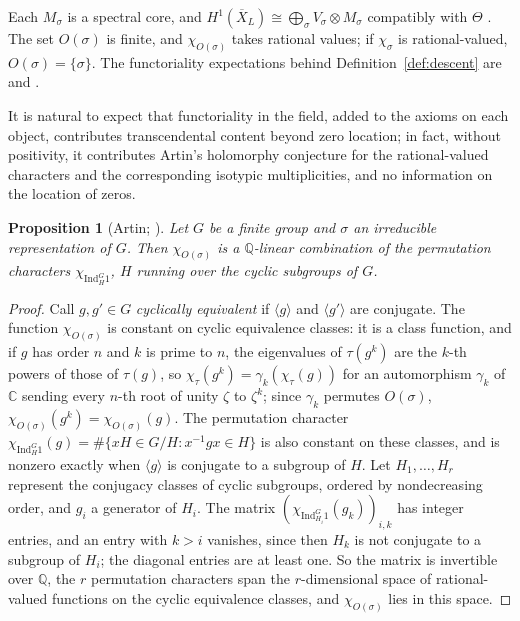 \documentclass[11pt]{amsart}
\theoremstyle{plain}
\newtheorem{proposition}[theorem]{Proposition}
\theoremstyle{definition}
\theoremstyle{remark}
\numberwithin{equation}{section}
\newcommand{\C}{\mathbb{C}}
\newcommand{\Q}{\mathbb{Q}}
\newcommand{\Xbar}{\overline{X}}
\begin{document}
Each $M_\sigma$ is a spectral core, and $H^1(\Xbar_L)\cong\bigoplus_\sigma
V_\sigma\otimes M_\sigma$ compatibly with $\Theta$
\cite[p.~4]{Deninger2022NoWeil}. The set $O(\sigma)$ is finite, and
$\chi_{O(\sigma)}$ takes rational values; if $\chi_\sigma$ is
rational-valued, $O(\sigma)=\{\sigma\}$.
The functoriality expectations behind Definition~\ref{def:descent} are
\cite[p.~4]{Deninger2022NoWeil} and
\cite[\S\S2.8--2.10]{Deninger2025BSDDedekind}.

It is natural to expect that functoriality in the field, added to the
axioms on each object, contributes transcendental content beyond zero
location; in fact, without positivity, it contributes Artin's
holomorphy conjecture for the rational-valued characters and the
corresponding isotypic multiplicities, and no information on the
location of zeros.

\begin{proposition}[{Artin; \cite[\S13.1, Theorems~29--30,
pp.~102--103]{Serre1977LinearReps}}]\label{prop:perm-span}
Let $G$ be a finite group and $\sigma$ an irreducible representation of
$G$. Then $\chi_{O(\sigma)}$ is a $\Q$-linear combination of the
permutation characters $\chi_{\mathrm{Ind}_H^G1}$, $H$ running over the
cyclic subgroups of $G$.
\end{proposition}

\begin{proof}
Call $g,g'\in G$ \emph{cyclically equivalent} if $\langle g\rangle$ and
$\langle g'\rangle$ are conjugate. The function $\chi_{O(\sigma)}$ is
constant on cyclic equivalence classes: it is a class function, and if
$g$ has order $n$ and $k$ is prime to $n$, the eigenvalues of
$\tau(g^k)$ are the $k$-th powers of those of $\tau(g)$, so
$\chi_\tau(g^k)=\gamma_k(\chi_\tau(g))$ for an automorphism $\gamma_k$
of $\C$ sending every $n$-th root of unity $\zeta$ to $\zeta^k$; since
$\gamma_k$ permutes $O(\sigma)$, $\chi_{O(\sigma)}(g^k)=
\chi_{O(\sigma)}(g)$. The permutation character
$\chi_{\mathrm{Ind}_H^G1}(g)=\#\{xH\in G/H:x^{-1}gx\in H\}$ is also
constant on these classes, and is nonzero exactly when $\langle
g\rangle$ is conjugate to a subgroup of $H$. Let $H_1,\dots,H_r$
represent the conjugacy classes of cyclic subgroups, ordered by
nondecreasing order, and $g_i$ a generator of $H_i$. The matrix
$(\chi_{\mathrm{Ind}_{H_i}^G1}(g_k))_{i,k}$ has integer entries, and an
entry with $k>i$ vanishes, since then $H_k$ is not conjugate to a
subgroup of $H_i$; the diagonal entries are at least one. So the
matrix is invertible over $\Q$, the $r$ permutation characters span
the $r$-dimensional space of rational-valued functions on the cyclic
equivalence classes, and $\chi_{O(\sigma)}$ lies in this space.
\end{proof}
\end{document}

